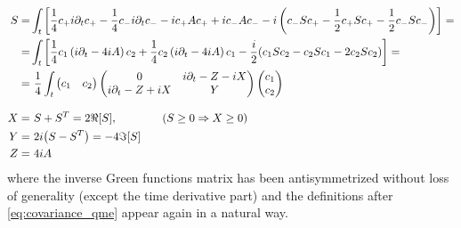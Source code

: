 \documentclass[a4paper,11pt]{article}
\theoremstyle{remark}
\newcommand{\np}{\vskip 1.3cm}
\begin{document}
   \begin{align}
    S =& \int_t \left[\frac{1}{4}c_+i\partial_tc_+-\frac{1}{4}c_-i\partial_tc_- -ic_+Ac_+ + ic_-Ac_- -i \left(c_-Sc_+ -\frac{1}{2}c_+Sc_+ -\frac{1}{2}c_-Sc_-\right)\right]= \notag\\ =& \int_t \left[ \frac{1}{4} c_1\left(i\partial_t -4iA\right)c_2 + \frac{1}{4} c_2\left(i\partial_t -4iA\right)c_1 -\frac{i}{2}(c_1Sc_2-c_2Sc_1-2c_2Sc_2) \right]= \notag \\
    =&\ \frac{1}{4} \int_t 
               \begin{pmatrix}
                c_1 & c_2
               \end{pmatrix}
               \begin{pmatrix}
                0 & i\partial_t - Z - iX \\ i\partial_t - Z + iX & Y
               \end{pmatrix}
               \begin{pmatrix}
                c_1 \\ c_2
               \end{pmatrix}\\[0.3cm]
    X =&\  S+S^T = 2\Re[S], \quad\quad\quad\quad (S\geq 0\Rightarrow X\geq 0) \notag\\
    Y =&\ 2i\big(S-S^T\big) = -4\Im[S] \notag \\
    Z =&\ 4iA \notag 
   \end{align}
   where the inverse Green functions matrix has been antisymmetrized without loss of generality (except the time derivative part) and the definitions after \ref{eq:covariance_qme} appear again in a natural way.
  \np
\end{document}
